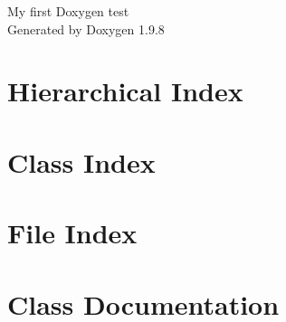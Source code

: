 \documentclass[twoside]{book}
\newcommand{\+}{\discretionary{\mbox{\scriptsize$\hookleftarrow$}}{}{}}
\newcommand{\clearemptydoublepage}{%
    \newpage{\pagestyle{empty}\cleardoublepage}%
  }
\begin{document}
  \raggedbottom
    \hypersetup{pageanchor=false,
                bookmarksnumbered=true,
                pdfencoding=unicode
               }
  \begin{titlepage}
  \vspace*{7cm}
  \begin{center}%
  {\Large My first Doxygen test}\\
  \vspace*{1cm}
  {\large Generated by Doxygen 1.9.8}\\
  \end{center}
  \end{titlepage}
  \clearemptydoublepage
  \tableofcontents
  \clearemptydoublepage
  \hypersetup{pageanchor=true}
\chapter{Hierarchical Index}

\chapter{Class Index}

\chapter{File Index}

\chapter{Class Documentation}











\end{document}

